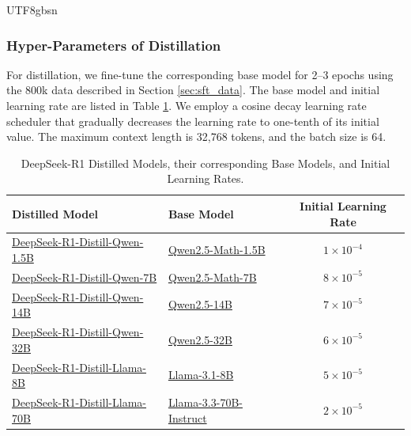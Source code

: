 \documentclass[11pt, a4paper, logo, copyright, nonumbering]{deepseek}
\begin{document}
\begin{CJK*}{UTF8}{gbsn}
\subsubsection{Hyper-Parameters of Distillation}
\label{appendix:distill-params}

For distillation, we fine-tune the corresponding base model for 2–3 epochs using the 800k data described in Section \ref{sec:sft_data}. The base model and initial learning rate are listed in Table \ref{tab:distill_config}. We employ a cosine decay learning rate scheduler that gradually decreases the learning rate to one-tenth of its initial value. The maximum context length is 32,768 tokens, and the batch size is 64.

\begin{table}[h]
    \centering
      \caption{DeepSeek-R1 Distilled Models, their corresponding Base Models, and Initial Learning Rates.}
    \label{tab:distill_config}
    \begin{tabular}{llc}
        \toprule
        \textbf{Distilled Model} & \textbf{Base Model} & \textbf{Initial Learning Rate} \\
        \midrule
        \href{https://huggingface.co/deepseek-ai/DeepSeek-R1-Distill-Qwen-1.5B}{DeepSeek-R1-Distill-Qwen-1.5B} &
        \href{https://huggingface.co/Qwen/Qwen2.5-Math-1.5B}{Qwen2.5-Math-1.5B} & $1\times10^{-4}$ \\
        \href{https://huggingface.co/deepseek-ai/DeepSeek-R1-Distill-Qwen-7B}{DeepSeek-R1-Distill-Qwen-7B} &
        \href{https://huggingface.co/Qwen/Qwen2.5-Math-7B}{Qwen2.5-Math-7B} & $8\times10^{-5}$ \\
        \href{https://huggingface.co/deepseek-ai/DeepSeek-R1-Distill-Qwen-14B}{DeepSeek-R1-Distill-Qwen-14B} &
        \href{https://huggingface.co/Qwen/Qwen2.5-14B}{Qwen2.5-14B} & $7\times10^{-5}$ \\
        \href{https://huggingface.co/deepseek-ai/DeepSeek-R1-Distill-Qwen-32B}{DeepSeek-R1-Distill-Qwen-32B} &
        \href{https://huggingface.co/Qwen/Qwen2.5-32B}{Qwen2.5-32B} & $6\times10^{-5}$ \\
        \href{https://huggingface.co/deepseek-ai/DeepSeek-R1-Distill-Llama-8B}{DeepSeek-R1-Distill-Llama-8B} &
        \href{https://huggingface.co/meta-llama/Llama-3.1-8B}{Llama-3.1-8B} & $5\times10^{-5}$ \\
        \href{https://huggingface.co/deepseek-ai/DeepSeek-R1-Distill-Llama-70B}{DeepSeek-R1-Distill-Llama-70B} &
        \href{https://huggingface.co/meta-llama/Llama-3.3-70B-Instruct}{Llama-3.3-70B-Instruct} & $2\times10^{-5}$ \\
        \bottomrule
    \end{tabular}
  

\end{table}
\end{CJK*}
\end{document}
